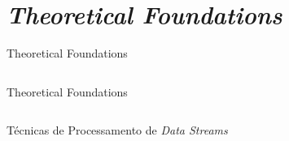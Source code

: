 \section{\itshape Theoretical Foundations}

\begin{frame}{{Theoretical Foundations}}
    \begin{columns}
	    \centering

	    \centering
      
	\end{columns}
\end{frame}

\begin{frame}{{Theoretical Foundations}}
	\begin{columns}
	    \centering
	       
	        
	    \centering
	      
	\end{columns}
\end{frame}


\begin{frame}{Técnicas de Processamento de \textit{Data Streams}}
	
\end{frame}